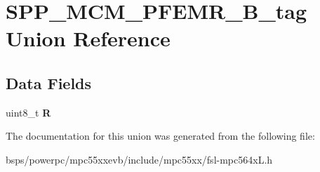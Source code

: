 \hypertarget{unionSPP__MCM__PFEMR__8B__tag}{}\section{S\+P\+P\+\_\+\+M\+C\+M\+\_\+\+P\+F\+E\+M\+R\+\_\+B\+\_\+tag Union Reference}
\label{unionSPP__MCM__PFEMR__8B__tag}
\subsection*{Data Fields}
\begin{DoxyCompactItemize}
\item 
\mbox{\label{unionSPP__MCM__PFEMR__8B__tag_ad534f028eb089454271a4359a5bb74e0}} 
uint8\+\_\+t {\bfseries R}
\end{DoxyCompactItemize}


The documentation for this union was generated from the following file\+:\begin{DoxyCompactItemize}
\item 
bsps/powerpc/mpc55xxevb/include/mpc55xx/fsl-\/mpc564x\+L.\+h\end{DoxyCompactItemize}
